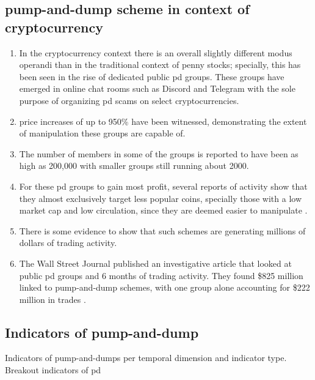\subsection{pump-and-dump scheme in context of cryptocurrency}
\begin{enumerate}
    \item In the cryptocurrency context there is an overall slightly different modus operandi than in the traditional context of penny stocks; specially, this has been seen in the rise of dedicated public \ac{pd} groups. These groups have emerged in online chat rooms such as Discord and Telegram with the sole purpose of organizing \ac{pd} scams on select cryptocurrencies\cite{P&D_to_the_moon,P&D_MIT_crypto}.
    \item price increases of up to 950\% have been witnessed, demonstrating the extent of manipulation these groups are capable of\cite{P&D_cointelegraph}.
    \item The number of members in some of the groups is reported to have been as high as 200,000 with smaller groups still running about 2000\cite{P&D_the_outline}.
    \item For these \ac{pd} groups to gain most profit, several reports of activity show that they almost exclusively target less popular coins, specially those with a low market cap and low circulation, since they are deemed easier to manipulate \cite{P&D_MIT_crypto}.
    \item There is some evidence to show that such schemes are generating millions of dollars of trading activity\cite{P&D_to_the_moon, P&D_MIT_crypto}.
    \item The Wall Street Journal published an investigative article that looked at public \ac{pd} groups and 6 months of trading activity. They found \$825 million linked to pump-and-dump schemes, with one group alone accounting for \$222 million in trades \cite{P&D_WSJ}.
\end{enumerate}

\subsection{Indicators of pump-and-dump}

Indicators of pump-and-dumps per temporal dimension and indicator type. Breakout indicators of \ac{pd}

